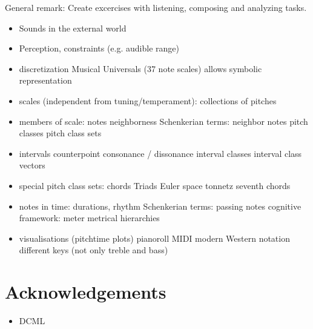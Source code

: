 \documentclass[letterpaper,10pt,english]{sphinxmanual}
\begin{document}
General remark: Create excercises with listening, composing and analyzing tasks.
\begin{itemize}
\item {} 
Sounds in the external world

\item {} 
Perception, constraints (e.g. audible range)

\item {} 
discretization
\sphinxhyphen{} Musical Universals (3\sphinxhyphen{}7 note scales)
\sphinxhyphen{} allows symbolic representation

\item {} 
scales (independent from tuning/temperament): collections of pitches

\item {} 
members of scale: notes
\sphinxhyphen{} neighborness
\sphinxhyphen{} Schenkerian terms: neighbor notes
\sphinxhyphen{} pitch classes
\sphinxhyphen{} pitch class sets

\item {} 
intervals
\sphinxhyphen{} counterpoint
\sphinxhyphen{} consonance / dissonance
\sphinxhyphen{} interval classes
\sphinxhyphen{} interval class vectors

\item {} 
special pitch class sets: chords
\sphinxhyphen{} Triads
\sphinxhyphen{} Euler space
\sphinxhyphen{} tonnetz
\sphinxhyphen{} seventh chords

\item {} 
notes in time: durations, rhythm
\sphinxhyphen{} Schenkerian terms: passing notes
\sphinxhyphen{} cognitive framework: meter
\sphinxhyphen{} metrical hierarchies

\item {} 
visualisations (pitch\sphinxhyphen{}time plots)
\sphinxhyphen{} pianoroll
\sphinxhyphen{} MIDI
\sphinxhyphen{} modern Western notation
\sphinxhyphen{} different keys (not only treble and bass)

\end{itemize}


\section{Acknowledgements}
\label{\detokenize{1_intro:acknowledgements}}\begin{itemize}
\item {} 
DCML

\end{itemize}
\end{document}
